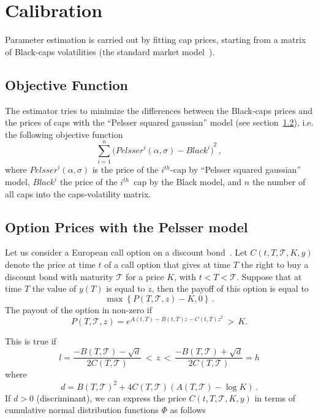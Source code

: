\section{Calibration}

Parameter estimation is carried out by fitting cap prices, starting from a matrix of Black-caps volatilities (the standard market model~\cite{Hull:OptFutDer}).
\subsection{Objective Function}
The estimator tries to minimize the differences between the Black-caps prices and the prices of caps with the ``Pelsser squared gaussian'' model (see section~\ref{OP}), i.e. the following objective function
\begin{equation}
\displaystyle\sum_{i=1}^n {\Big( {{Pelsser}^i(\alpha,\sigma)} - {Black}^i \Big)}^2  \, ,
\end{equation}
where ${{Pelsser}^i(\alpha,\sigma)}$ is the price of the $i^{th}$-cap by ``Pelsser squared gaussian'' model, ${Black}^i$ the price of the $i^{th}$~cap by the Black model, and $n$ the number of all caps into the caps-volatility matrix.


\subsection{Option Prices with the Pelsser model}
\label{OP}
Let us consider a European call option on a discount bond~\cite{ArtPelsser}. Let $C(t, T, \mathcal{T}, K, y)$ denote the price at time $t$ of a call option that gives at time $T$ the right to buy a discount bond with maturity $\mathcal{T}$ for a price $K$, with $ t < T < \mathcal{T}$. Suppose that at time $T$ the value of $y(T)$ is equal to $z$, then the payoff of this option is equal to
$$ \max{\left\lbrace P(T, \mathcal{T}, z) - K, 0 \right\rbrace } \, .$$
The payout of the option in non-zero if
$$ P(T, \mathcal{T}, z) = \displaystyle{e}^{\displaystyle{A(t,T) - B(t,T) z - C(t,T) z^2 }} \, > \, K .$$
\begin{comment}
where
\begin{eqnarray}
D(t,T) & = & \dfrac{2\gamma e^{\gamma(T-t)}}{(a+\gamma)e^{2\gamma(T-t)}+(\gamma - a)} \nonumber \\
C(t,T) & = & \dfrac{e^{2\gamma(T-t)}-1}{(a+\gamma)e^{2\gamma(T-t)}+(\gamma - a)} \nonumber \\
B(t,T) & = & 2 D(t,T) \displaystyle{ \int_t^T \dfrac{\alpha(s)}{D(s,T)} \, ds }\nonumber \\
A(t,T) & = & \displaystyle{\int_t^T \frac{1}{2}\sigma^2 B(s,T)^2 - \sigma^2 C(s,T) - \alpha(s)^2 \, ds  } \nonumber \\
\gamma & = & \sqrt{a^2+2\sigma^2} \, .
\end{eqnarray}
\end{comment}
This is true if
$$ l = \dfrac{-B(T,\mathcal{T})-\sqrt{d}}{2 C(T,\mathcal{T})} \, < \, z \, < \, \dfrac{-B(T,\mathcal{T})+\sqrt{d}}{2 C(T,\mathcal{T})} = h $$
where
$$ d = {B(T,\mathcal{T})}^2 + 4C(T,\mathcal{T})(A(T,\mathcal{T})-\log{K}) \, . $$
If $d > 0$ (discriminant), we can express the price $C(t, T, \mathcal{T}, K, y)$ in terms of cumulative normal distribution functions $\Phi$ as follows

